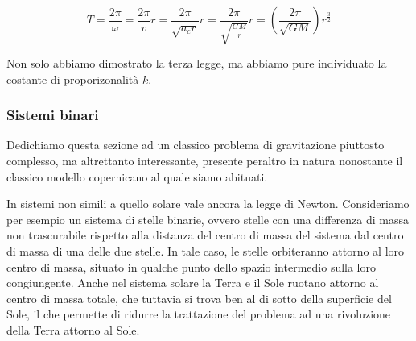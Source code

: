 \[ T = \frac{2\pi}{\omega} = \frac{2\pi}{v}r = \frac{2\pi}{\sqrt{a_c r}}r = \frac{2\pi}{\sqrt{\frac{GM}{r}}}r = \left(\frac{2\pi}{\sqrt{GM}}\right)r^\frac{3}{2} \]

\noindent Non solo abbiamo dimostrato la terza legge, ma abbiamo pure individuato la
costante di proporizonalità $k$.

\subsubsection*{Sistemi binari}
Dedichiamo questa sezione ad un classico problema di gravitazione piuttosto complesso,
ma altrettanto interessante, presente peraltro in natura nonostante il classico
modello copernicano al quale siamo abituati.

In sistemi non simili a quello solare vale ancora la legge di Newton. Consideriamo
per esempio un sistema di stelle binarie, ovvero stelle con una differenza di massa
non trascurabile rispetto alla distanza del centro di massa del sistema dal centro
di massa di una delle due stelle. In tale caso, le stelle orbiteranno attorno al
loro centro di massa, situato in qualche punto dello spazio intermedio sulla loro
congiungente. Anche nel sistema solare la Terra e il Sole ruotano attorno al centro
di massa totale, che tuttavia si trova ben al di sotto della superficie del Sole,
il che permette di ridurre la trattazione del problema ad una rivoluzione della
Terra attorno al Sole.